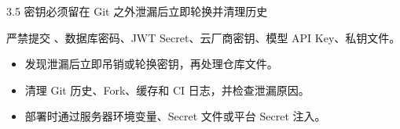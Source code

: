 \begin{frame}{3.5 密钥必须留在 Git 之外}{泄漏后立即轮换并清理历史}
  \begin{alertblock}{严禁提交}
    、数据库密码、JWT Secret、云厂商密钥、模型 API Key、私钥文件。
  \end{alertblock}
  \begin{itemize}
    \item 发现泄漏后立即吊销或轮换密钥，再处理仓库文件。
    \item 清理 Git 历史、Fork、缓存和 CI 日志，并检查泄漏原因。
    \item 部署时通过服务器环境变量、Secret 文件或平台 Secret 注入。
  \end{itemize}
\end{frame}
